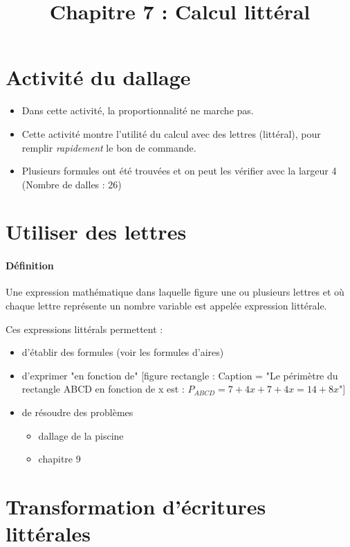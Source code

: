 \documentclass[
	a4paper,
	twocolumn=false,
	12pts,
	DIV=calc]%
	{article}
\title{Chapitre 7 : Calcul littéral}
\date{}
\begin{document}
\maketitle
\section*{Activité du dallage}
\begin{itemize}
	\item Dans cette activité, la proportionnalité ne marche pas.
	\item Cette activité montre l’utilité du calcul avec des lettres (littéral), pour remplir \emph{rapidement} le bon de commande.
	\item Plusieurs formules ont été trouvées et on peut les vérifier avec la largeur 4 (Nombre de dalles : 26)
\end{itemize}

\section{Utiliser des lettres}

\paragraph{Définition} Une expression mathématique dans laquelle figure une ou plusieurs lettres et
où chaque lettre représente un nombre variable est appelée expression littérale.

Ces expressions littérals permettent :

\begin{itemize}
	\item d’établir des formules (voir les formules d’aires)
	\item d’exprimer "en fonction de"
	[figure rectangle : Caption = "Le périmètre du rectangle ABCD en fonction de x est : $P_{ABCD} = 7 + 4x + 7 + 4x = 14 + 8x$"]
	\item de résoudre des problèmes
	\begin{itemize}
		\item dallage de la piscine
		\item chapitre 9
	\end{itemize}
\end{itemize}

\section{Transformation d'écritures littérales}
\end{document}
